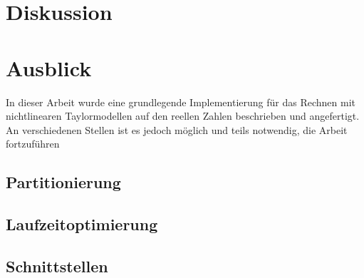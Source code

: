 
\chapter{Diskussion}
\label{ch:fazit}

\chapter{Ausblick}
In dieser Arbeit wurde eine grundlegende Implementierung für das Rechnen mit nichtlinearen Taylormodellen auf den reellen Zahlen beschrieben und angefertigt. An verschiedenen Stellen ist es jedoch möglich und teils notwendig, die Arbeit fortzuführen

\section{Partitionierung}

\section{Laufzeitoptimierung}

\section{Schnittstellen}


